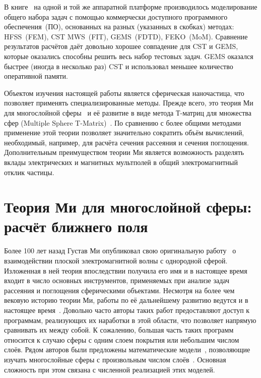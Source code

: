 В книге~\cite{Yu-Advanced-FDTD-2011} на одной и той же аппаратной
платформе производилось моделирование общего набора задач с помощью
коммерчески доступного программного обеспечения~(ПО), основанных на разных
(указанных в скобках) методах: HFSS~(FEM), CST MWS~(FIT), GEMS~(FDTD),
FEKO~(MoM). Сравнение результатов расчётов даёт довольно хорошее
совпадение для CST и GEMS, которые оказались способны решить весь
набор тестовых задач. GEMS оказался быстрее (иногда в несколько раз)
CST и использовал меньшее количество оперативной памяти.

Объектом изучения настоящей работы является сферическая наночастица,
что позволяет применять специализированные методы. Прежде
всего, это теория Ми для многослойной сферы~\cite{Yang-2003} и её
развитие в виде метода Т-матриц для множества сфер (Multiple Sphere
T-Matrix)~\cite{MacKowski-2012}.  По сравнению с более общими методами
применение этой теории позволяет значительно сократить объём
вычислений, необходимый, например, для расчёта сечения рассеяния и
сечения поглощения.  Дополнительным преимуществом теории Ми является
возможность разделять вклады электрических и магнитных мультполей в
общий электромагнитный отклик частицы.


\section{Теория Ми для многослойной сферы: расчёт ближнего поля}
\label{sec:Mie}

Более 100 лет назад Густав Ми опубликовал свою оригинальную
работу~\cite{Mie-1908} о взаимодействии плоской электромагнитной волны
с однородной сферой.  Изложенная в ней теория впоследствии получила
его имя и в настоящее время входит в число основных инструментов,
применяемых при анализе задач рассеяния и поглощения сферическими
объектами.  Несмотря на более чем вековую историю теории Ми, работы по
её дальнейшему развитию ведутся и в настоящее время~\cite{Suzuki-2008,
  MacKowski-2012, Lerme-2000, Xu-2005, Li-2006, Gogoi-2010,
  Santiago-2011}.  Довольно часто авторы таких работ предоставляют
доступ к программам, реализующих их наработки в этой области, что
позволяет напрямую сравнивать их между собой.  К сожалению, большая
часть таких программ относится к случаю сферы с одним слоем покрытия
или небольшим числом слоёв. Рядом авторов были
предложены математические модели~\cite{Yang-2003,
  Pena-scattnlay-2009}, позволяющие изучать многослойные сферы с
произвольным числом слоёв~\cite{Sheehan-2013,Selmke-2012}.  Основная
сложность при этом связана с численной реализацией этих моделей.

